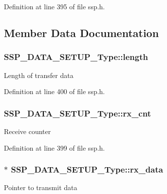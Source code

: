 Definition at line 395 of file ssp.\+h.



\subsection{Member Data Documentation}
\subsubsection[{\texorpdfstring{length}{length}}]{ S\+S\+P\+\_\+\+D\+A\+T\+A\+\_\+\+S\+E\+T\+U\+P\+\_\+\+Type\+::length}\hypertarget{struct_s_s_p___d_a_t_a___s_e_t_u_p___type_a15861aad38292a3b5b5bc2137be7b471}{}\label{struct_s_s_p___d_a_t_a___s_e_t_u_p___type_a15861aad38292a3b5b5bc2137be7b471}
Length of transfer data 

Definition at line 400 of file ssp.\+h.

\subsubsection[{\texorpdfstring{rx\+\_\+cnt}{rx_cnt}}]{ S\+S\+P\+\_\+\+D\+A\+T\+A\+\_\+\+S\+E\+T\+U\+P\+\_\+\+Type\+::rx\+\_\+cnt}\hypertarget{struct_s_s_p___d_a_t_a___s_e_t_u_p___type_ad0a0475e1e9ebfd10d6ddacf40a34e20}{}\label{struct_s_s_p___d_a_t_a___s_e_t_u_p___type_ad0a0475e1e9ebfd10d6ddacf40a34e20}
Receive counter 

Definition at line 399 of file ssp.\+h.

\subsubsection[{\texorpdfstring{rx\+\_\+data}{rx_data}}]{$\ast$ S\+S\+P\+\_\+\+D\+A\+T\+A\+\_\+\+S\+E\+T\+U\+P\+\_\+\+Type\+::rx\+\_\+data}\hypertarget{struct_s_s_p___d_a_t_a___s_e_t_u_p___type_a8ecbeda1d5013eb75f16e9260e1e99df}{}\label{struct_s_s_p___d_a_t_a___s_e_t_u_p___type_a8ecbeda1d5013eb75f16e9260e1e99df}
Pointer to transmit data 

